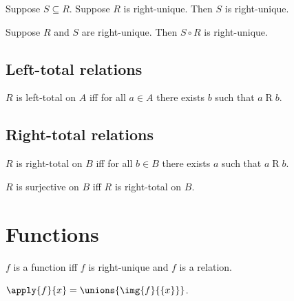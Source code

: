 \begin{proposition}\label{subseteq_of_rightunique_is_rightunique}
    Suppose $S\subseteq R$.
    Suppose $R$ is right-unique.
    Then $S$ is right-unique.
\end{proposition}

\begin{proposition}\label{circ_rightunique}
    Suppose $R$ and $S$ are right-unique.
    Then $S\circ R$ is right-unique.
\end{proposition}



\subsection{Left-total relations}

\begin{definition}\label{lefttotal}
    $R$ is left-total on $A$ iff
    for all $a\in A$ there exists $b$ such that $a\mathrel{R} b$.
\end{definition}


\subsection{Right-total relations}

\begin{definition}\label{righttotal}
    $R$ is right-total on $B$ iff
    for all $b\in B$ there exists $a$ such that $a\mathrel{R} b$.
\end{definition}

\begin{abbreviation}\label{surjective}
    $R$ is surjective on $B$ iff $R$ is right-total on $B$.
\end{abbreviation}\section{Functions}



\begin{abbreviation}\label{function}
    $f$ is a function iff $f$ is right-unique and $f$ is a relation.
\end{abbreviation}

\begin{definition}\label{apply}
    $\apply{f}{x} = \unions{\img{f}{\{x\}}}$.
\end{definition}

